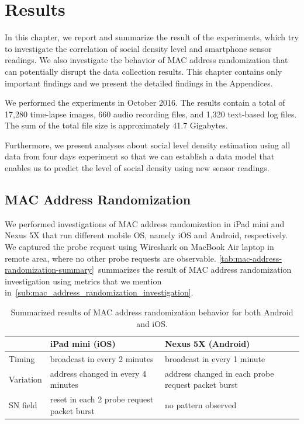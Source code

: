 \chapter{Results}
\label{ch:results} %
In this chapter, we report and summarize the result of the experiments, which try to investigate the correlation of social density level and smartphone sensor readings. We also investigate the behavior of \ac{MAC} address randomization that can potentially disrupt the data collection results. This chapter contains only important findings and we present the detailed findings in the Appendices.

We performed the experiments in October 2016. The results contain a total of 17,280 time-lapse images, 660 audio recording files, and 1,320 text-based log files. The sum of the total file size is approximately 41.7 Gigabytes.

Furthermore, we present analyses about social level density estimation using all data from four days experiment so that we can establish a data model that enables us to predict the level of social density using new sensor readings.

\section{MAC Address Randomization} %
\label{sec:mac-address-randomization}
We performed investigations of \ac{MAC} address randomization in iPad mini and Nexus 5X that run different mobile \ac{OS}, namely iOS and Android, respectively. We captured the probe request using Wireshark on MacBook Air laptop in remote area, where no other probe requests are observable. \autoref{tab:mac-address-randomization-summary}~summarizes the result of \ac{MAC} address randomization investigation using metrics that we mention in~\autoref{sub:mac_address_randomization_investigation}.

\begin{table}[ht]
\centering
\caption[Summarized MAC address randomization behavior.]
{Summarized results of \ac{MAC} address randomization behavior for both Android and iOS.}
\label{tab:mac-address-randomization-summary}
\begin{tabularx}{\textwidth}{lXX}
\toprule
                                        & iPad mini (iOS) & Nexus 5X (Android) \\
                                        \midrule
Timing    & broadcast in every 2 minutes & broadcast in every 1 minute \\ 
Variation & address changed in every 4 minutes & address changed in each probe request packet burst \\
\ac{SN} field & reset in each 2 probe request packet burst & no pattern observed \\ \bottomrule
\end{tabularx}
\end{table}

